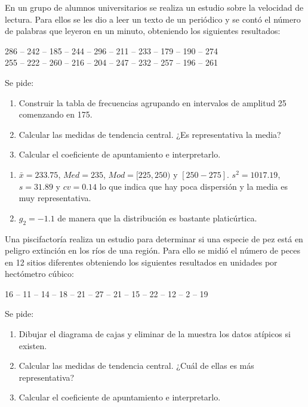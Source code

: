 {En un grupo de alumnos universitarios se realiza un estudio sobre la velocidad de lectura.
Para ellos se les dio a leer un texto de un periódico y se contó el número de palabras que leyeron en un minuto, obteniendo los siguientes resultados:
\begin{center}
286 -- 242 -- 185 -- 244 -- 296 -- 211 -- 233 -- 179 -- 190 -- 274 \\
255 -- 222 -- 260 -- 216 -- 204 -- 247 -- 232 -- 257 -- 196 -- 261
\end{center}
Se pide:
\begin{enumerate}
\item Construir la tabla de frecuencias agrupando en intervalos de amplitud 25 comenzando en 175.
\item Calcular las medidas de tendencia central. ¿Es representativa la media?
\item Calcular el coeficiente de apuntamiento e interpretarlo.
\end{enumerate}
}
{\begin{enumerate}[start=2]
\item $\bar{x}=233.75$, $Med=235$, $Mod= [225,250)$ y $[250-275]$. $s^2=1017.19$, $s=31.89$ y $cv=0.14$ lo que indica que hay poca dispersión y la media es muy representativa.
\item $g_2=-1.1$ de manera que la distribución es bastante platicúrtica. 
\end{enumerate}
}
{}


{Una piscifactoría realiza un estudio para determinar si una especie de pez está en peligro extinción en los ríos de una región.
Para ello se midió el número de peces en 12 sitios diferentes obteniendo los siguientes resultados en unidades por hectómetro cúbico:
\begin{center}
  16 -- 11 -- 14 -- 18 -- 21 -- 27 -- 21 -- 15 -- 22 -- 12 -- 2 -- 19
\end{center}
Se pide:
\begin{enumerate}
\item Dibujar el diagrama de cajas y eliminar de la muestra los datos atípicos si existen.
\item Calcular las medidas de tendencia central. ¿Cuál de ellas es más representativa?
\item Calcular el coeficiente de apuntamiento e interpretarlo.
\end{enumerate}
}


